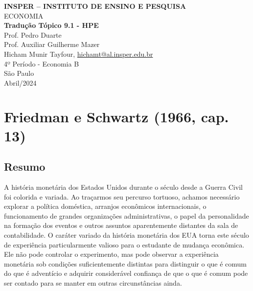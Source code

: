 \documentclass[a4paper,12pt]{article}[abntex2]
\begin{document}
\begin{titlepage}
    \centering
    \vspace*{1cm}
    \Large\textbf{INSPER – INSTITUTO DE ENSINO E PESQUISA}\\
    \Large ECONOMIA\\
    \vspace{1.5cm}
    \Large\textbf{Tradução Tópico 9.1 - HPE}\\
    \vspace{1.5cm}
    Prof. Pedro Duarte\\
    Prof. Auxiliar Guilherme Mazer\\
    \vfill
    \normalsize
    Hicham Munir Tayfour, \href{mailto:hichamt@al.insper.edu.br}{hichamt@al.insper.edu.br}\\
    4º Período - Economia B\\
    \vfill
    São Paulo\\
    Abril/2024
\end{titlepage}

\newpage
\tableofcontents
\thispagestyle{empty} %
\newpage
\setcounter{page}{1} %
\justify
\onehalfspacing

\pagestyle{fancy}
\fancyhf{}
\rhead{\thepage}

\section{\textbf{Friedman e Schwartz (1966, cap. 13)}}
\subsection{\textbf{Resumo}}

A história monetária dos Estados Unidos durante o século desde a Guerra Civil foi colorida e variada. Ao traçarmos seu percurso tortuoso, achamos necessário explorar a política doméstica, arranjos econômicos internacionais, o funcionamento de grandes organizações administrativas, o papel da personalidade na formação dos eventos e outros assuntos aparentemente distantes da sala de contabilidade. O caráter variado da história monetária dos EUA torna este século de experiência particularmente valioso para o estudante de mudança econômica. Ele não pode controlar o experimento, mas pode observar a experiência monetária sob condições suficientemente distintas para distinguir o que é comum do que é adventício e adquirir considerável confiança de que o que é comum pode ser contado para se manter em outras circunstâncias ainda.
\end{document}
